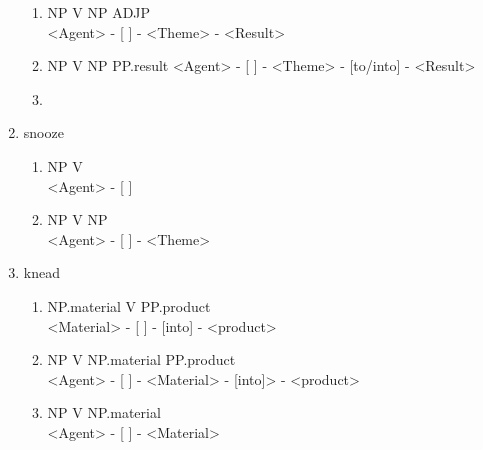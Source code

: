 \documentclass[11pt,a4paper,twocolumn]{article}
\begin{document}
\begin{enumerate}
\begin{enumerate}
					\item NP V NP ADJP\\
					<Agent> - [ ] - <Theme> - <Result>
					
					\item NP V NP PP.result
					<Agent> - [ ] - <Theme> - [to/into] - <Result>
					
					\item 
				\end{enumerate}

			\item snooze
				\begin{enumerate}
					\item NP V\\
					<Agent> - [ ]
					
					\item NP V NP\\
					<Agent> - [ ] - <Theme>
					 
				\end{enumerate}		
				
			\item knead
				\begin{enumerate}
					\item NP.material V PP.product\\
					<Material> - [ ] - [into] - <product>
					
					\item NP V NP.material PP.product\\
					<Agent> - [ ] - <Material> - [into]> - <product>
					
					
					\item NP V NP.material\\
					<Agent> - [ ] - <Material>
					
				\end{enumerate}										
			
		\end{enumerate}
	
\end{document}
